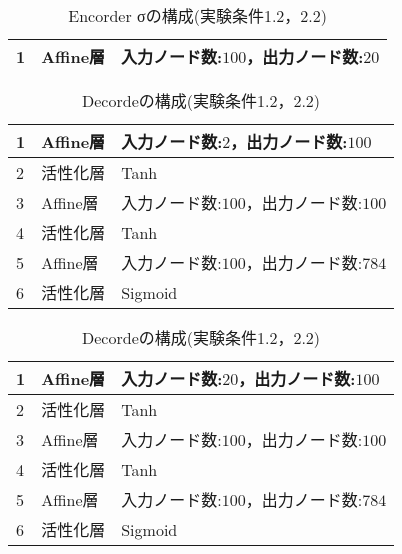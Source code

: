 \documentclass[12pt]{jsarticle}
\begin{document}
\begin{table}[bt]
\begin{center}
\caption{Encorder σの構成(実験条件1.2，2.2)}
\label{table:Encorder sigma-4}
\begin{tabularx}{0.9\linewidth}{|l|l|X|}
\hline
1 & Affine層 & 入力ノード数:$100$，出力ノード数:$20$ \\
\hline
\end{tabularx}
\end{center}
\end{table}


\begin{table}[bt]
\begin{center}
\caption{Decordeの構成(実験条件1.2，2.2)}
\label{table:Decorder}
\begin{tabularx}{0.9\linewidth}{|l|l|X|}
\hline
1 & Affine層 & 入力ノード数:$2$，出力ノード数:$100$ \\
\hline
2 & 活性化層 & Tanh \\
\hline
3 & Affine層 & 入力ノード数:$100$，出力ノード数:$100$ \\
\hline
4 & 活性化層 & Tanh \\
\hline
5 & Affine層 & 入力ノード数:$100$，出力ノード数:$784$ \\
\hline
6 & 活性化層 & Sigmoid \\
\hline

\end{tabularx}
\end{center}
\end{table}

\begin{table}[bt]
\begin{center}
\caption{Decordeの構成(実験条件1.2，2.2)}
\label{table:Decorder}
\begin{tabularx}{0.9\linewidth}{|l|l|X|}
\hline
1 & Affine層 & 入力ノード数:$20$，出力ノード数:$100$ \\
\hline
2 & 活性化層 & Tanh \\
\hline
3 & Affine層 & 入力ノード数:$100$，出力ノード数:$100$ \\
\hline
4 & 活性化層 & Tanh \\
\hline
5 & Affine層 & 入力ノード数:$100$，出力ノード数:$784$ \\
\hline
6 & 活性化層 & Sigmoid \\
\hline
\end{tabularx}
\end{center}
\end{table}
\end{document}

